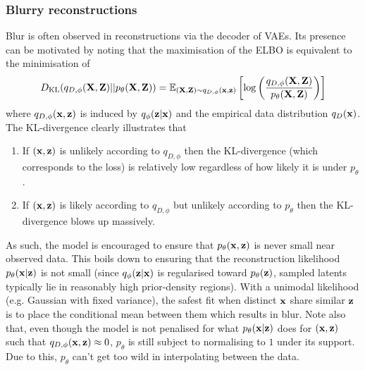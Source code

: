 \documentclass[11pt]{article}
\begin{document}
\subsubsection{Blurry reconstructions}
Blur is often observed in reconstructions via the decoder of VAEs. Its presence can be motivated by noting that the maximisation of the ELBO is equivalent to the minimisation of
$$
D_{\text{KL}}(q_{D,\phi}(\mathbf{X},\mathbf{Z})||p_{\theta}(\mathbf{X},\mathbf{Z}))
=
\mathbb{E}_{(\mathbf{X},\mathbf{Z})\sim q_{D,\phi}(\mathbf{x},\mathbf{z})}\left[\log\left(\frac{q_{D,\phi}(\mathbf{X},\mathbf{Z})}{p_{\theta}(\mathbf{X},\mathbf{Z})}\right)\right]
$$
where $q_{D,\phi}(\mathbf{x},\mathbf{z})$ is induced by $q_{\phi}(\mathbf{z}|\mathbf{x})$ and the empirical data distribution $q_D(\mathbf{x})$. The KL-divergence clearly illustrates that
\begin{enumerate}
    \item If $(\mathbf{x},\mathbf{z})$ is unlikely according to $q_{D,\phi}$ then the KL-divergence (which corresponds to the loss) is relatively low regardless of how likely it is under $p_{\theta}$.
    \item If $(\mathbf{x},\mathbf{z})$ is likely according to $q_{D,\phi}$ but unlikely according to $p_{\theta}$ then the KL-divergence blows up massively.
\end{enumerate}
As such, the model is encouraged to ensure that $p_{\theta}(\mathbf{x},\mathbf{z})$ is never small near observed data. This boils down to ensuring that the reconstruction likelihood $p_{\theta}(\mathbf{x}|\mathbf{z})$ is not small (since $q_{\phi}(\mathbf{z}|\mathbf{x})$ is regularised toward $p_{\theta}(\mathbf{z})$, sampled latents typically lie in reasonably high prior-density regions). With a unimodal likelihood (e.g. Gaussian with fixed variance), the safest fit when distinct $\mathbf{x}$ share similar $\mathbf{z}$ is to place the conditional mean between them which results in blur. Note also that, even though the model is not penalised for what $p_{\theta}(\mathbf{x}|\mathbf{z})$ does for $(\mathbf{x},\mathbf{z})$ such that $q_{D,\phi}(\mathbf{x},\mathbf{z})\approx0$, $p_{\theta}$ is still subject to normalising to $1$ under its support. Due to this, $p_{\theta}$ can't get too wild in interpolating between the data.
\end{document}
